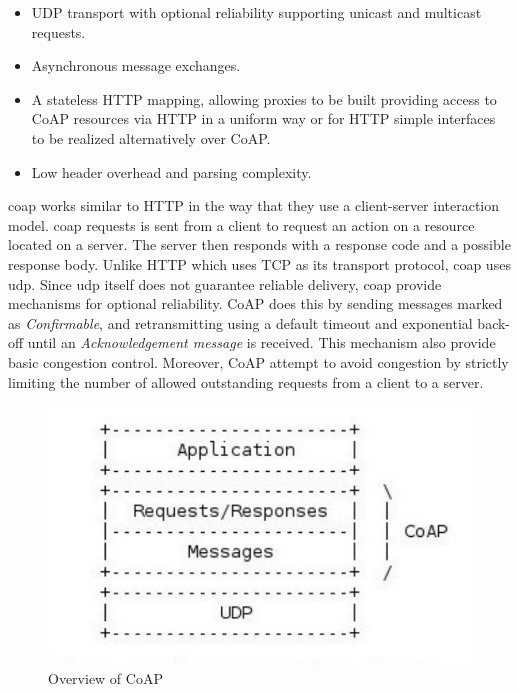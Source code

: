 \begin{itemize}

    \item UDP transport with optional reliability supporting unicast and
    multicast requests.

    \item Asynchronous message exchanges.

    \item A stateless HTTP mapping, allowing proxies to be built providing
    access to CoAP resources via HTTP in a uniform way or for HTTP simple
    interfaces to be realized alternatively over CoAP.

     \item Low header overhead and parsing complexity.

\end{itemize}

\gls{coap} works similar to HTTP in the way that they use a client-server
interaction model. \gls{coap} requests is sent from a client to request an
action on a resource located on a server. The server then responds with a
response code and a possible response body. Unlike HTTP which uses TCP as its
transport protocol, \gls{coap} uses \gls{udp}. Since \gls{udp} itself does not
guarantee reliable delivery, \gls{coap} provide mechanisms for optional
reliability. CoAP does this by sending messages marked as \textit{Confirmable},
and retransmitting using a default timeout and exponential back-off until an
\textit{Acknowledgement message} is received. This mechanism also provide basic
congestion control. Moreover, CoAP attempt to avoid congestion by strictly
limiting the number of allowed outstanding requests from a client to a server.

\begin{figure}[h]
\centering
\includegraphics[scale=0.6]{images/coap.pdf}
\caption{Overview of CoAP}
\end{figure}


